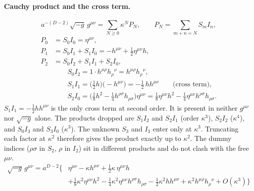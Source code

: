 \paragraph{Cauchy product and the cross term.} \tD
\begin{equation*}
a^{-(D-2)}\sqrt{-g}\,g^{\mu\nu}=\sum_{N\ge0}\kappa^N P_N,\qquad P_N=\sum_{m+n=N}S_mI_n ,
\end{equation*}
\begin{equation}
\begin{aligned}
P_0&=S_0I_0=\eta^{\mu\nu},\\
P_1&=S_0I_1+S_1I_0=-h^{\mu\nu}+\tfrac12\eta^{\mu\nu}h,\\
P_2&=S_0I_2+S_1I_1+S_2I_0,\\[3pt]
&\qquad S_0I_2=1\cdot h^{\mu\rho}h_\rho{}^\nu=h^{\mu\rho}h_\rho{}^\nu,\\
&\qquad S_1I_1=\big(\tfrac12h\big)\big(-h^{\mu\nu}\big)=-\tfrac12\,hh^{\mu\nu}\qquad\text{(cross term)},\\
&\qquad S_2I_0=\big(\tfrac18h^2-\tfrac14h^{\rho\sigma}h_{\rho\sigma}\big)\eta^{\mu\nu}=\tfrac18\eta^{\mu\nu}h^2-\tfrac14\eta^{\mu\nu}h^{\rho\sigma}h_{\rho\sigma}.
\end{aligned}
\label{eq:ch1-cauchy}
\end{equation}
$S_1I_1=-\tfrac12hh^{\mu\nu}$ is the only cross term at second order. It is
present in neither $g^{\mu\nu}$ nor $\sqrt{-g}$ alone. The products dropped are
$S_1I_2$ and $S_2I_1$ (order $\kappa^3$), $S_2I_2$ ($\kappa^4$), and $S_0I_3$ and
$S_3I_0$ ($\kappa^3$). The unknown $S_3$ and $I_3$ enter only at $\kappa^3$.
Truncating each factor at $\kappa^2$ therefore gives the product exactly up to
$\kappa^2$. The dummy indices ($\rho\sigma$ in $S_2$, $\rho$ in $I_2$) sit in
different products and do not clash with the free $\mu\nu$.
\begin{equation}
\boxed{\begin{aligned}\sqrt{-g}\,g^{\mu\nu}=a^{D-2}\Big\{&\eta^{\mu\nu}-\kappa h^{\mu\nu}+\tfrac12\kappa\,\eta^{\mu\nu}h\\
&+\tfrac18\kappa^2\eta^{\mu\nu}h^2-\tfrac14\kappa^2\eta^{\mu\nu}h^{\rho\sigma}h_{\rho\sigma}
-\tfrac12\kappa^2hh^{\mu\nu}+\kappa^2h^{\mu\rho}h_\rho{}^\nu+O(\kappa^3)\Big\}\end{aligned}}
\label{eq:ch1-product}
\end{equation}

